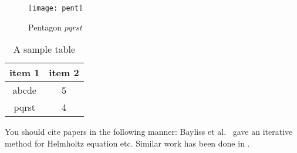 

\begin{figure}[]
\begin{center}
\texttt{[image: pent]}
\caption{Pentagon $pqrst$}
\label{fig:pent}
\end{center}
\end{figure}


\begin{table}
\centering
\begin{tabular}{| c | c |}
\hline
{\bf item 1} & {\bf item 2} \\ \hline
%
abcde & 5 \\ \hline
%
pqrst & 4 \\ \hline
\end{tabular}
\caption{A sample table}
\label{table:1}
\end{table}


You should cite papers in the following manner:
Bayliss et al.~\cite{gyrophone} gave an iterative method for Helmholtz equation etc.
Similar work has been done in \cite{walnut, goespin}.
